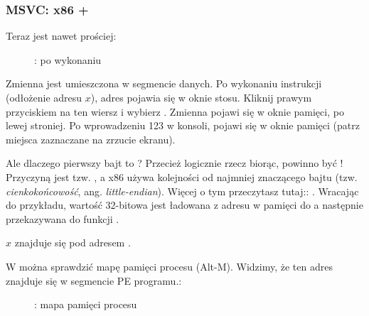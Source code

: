 \clearpage
\subsubsection{MSVC: x86 + \olly}
\myindex{\olly}

Teraz jest nawet prościej:

\begin{figure}[H]
\centering
{}
\caption{\olly: po wykonaniu \scanf}
\label{fig:scanf_ex2_olly_1}
\end{figure}

Zmienna jest umieszczona w segmencie danych.
Po wykonaniu instrukcji \PUSH (odłożenie adresu $x$),
adres pojawia się w oknie stosu. Kliknij prawym przyciskiem na ten wiersz i wybierz .
Zmienna pojawi się w oknie pamięci, po lewej stroniej.
Po wprowadzeniu 123 w konsoli,
 pojawi się w oknie pamięci (patrz miejsca zaznaczane na zrzucie ekranu).

Ale dlaczego pierwszy bajt to ?
Przecież logicznie rzecz biorąc, powinno być !
Przyczyną jest tzw. , a x86 używa kolejności od najmniej znaczącego bajtu (tzw. \emph{cienkokońcowość}, ang. \emph{little-endian}).
Więcej o tym przeczytasz tutaj:: .
Wracając do przykładu, wartość 32-bitowa jest ładowana z adresu w pamięci do \EAX a następnie przekazywana do funkcji \printf.

$x$ znajduje się pod adresem .

\clearpage
W \olly można sprawdzić mapę pamięci procesu (Alt-M).
Widzimy, że ten adres znajduje się w segmencie PE  programu.:

\label{olly_memory_map_example}
\begin{figure}[H]
\centering
{}
\caption{\olly: mapa pamięci procesu}
\label{fig:scanf_ex2_olly_2}
\end{figure}

